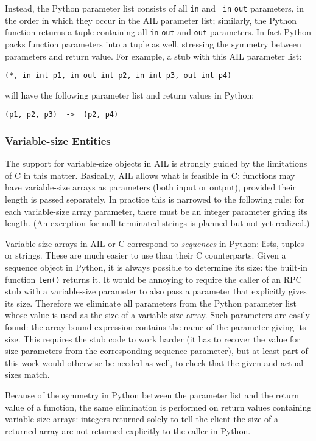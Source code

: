 Instead, the Python parameter list consists of all {\tt in} and {\tt
in} {\tt out} parameters, in the order in which they occur in the AIL
parameter list; similarly, the Python function returns a tuple
containing all {\tt in} {\tt out} and {\tt out} parameters.  In fact
Python packs function parameters into a tuple as well, stressing the
symmetry between parameters and return value.  For example, a stub
with this AIL parameter list:
\begin{verbatim}
(*, in int p1, in out int p2, in int p3, out int p4)
\end{verbatim}
will have the following parameter list and return values in Python:
\begin{verbatim}
(p1, p2, p3)  ->  (p2, p4)
\end{verbatim}

\subsubsection{Variable-size Entities}

The support for variable-size objects in AIL is strongly guided by the
limitations of C in this matter.  Basically, AIL allows what is
feasible in C: functions may have variable-size arrays as parameters
(both input or output), provided their length is passed separately.
In practice this is narrowed to the following rule: for each
variable-size array parameter, there must be an integer parameter
giving its length.  (An exception for null-terminated strings is
planned but not yet realized.)

Variable-size arrays in AIL or C correspond to {\em sequences} in
Python: lists, tuples or strings.  These are much easier to use than
their C counterparts.  Given a sequence object in Python, it is always
possible to determine its size: the built-in function {\tt len()}
returns it.  It would be annoying to require the caller of an RPC stub
with a variable-size parameter to also pass a parameter that
explicitly gives its size.  Therefore we eliminate all parameters from
the Python parameter list whose value is used as the size of a
variable-size array.  Such parameters are easily found: the array
bound expression contains the name of the parameter giving its size.
This requires the stub code to work harder (it has to recover the
value for size parameters from the corresponding sequence parameter),
but at least part of this work would otherwise be needed as well, to
check that the given and actual sizes match.

Because of the symmetry in Python between the parameter list and the
return value of a function, the same elimination is performed on
return values containing variable-size arrays: integers returned
solely to tell the client the size of a returned array are not
returned explicitly to the caller in Python.

